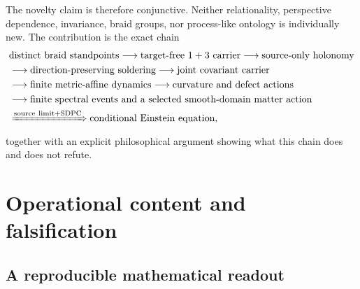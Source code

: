 \documentclass[11pt]{article}
\theoremstyle{definition}
\theoremstyle{remark}
\begin{document}
The novelty claim is therefore conjunctive. Neither relationality, perspective dependence, invariance, braid groups, nor process-like ontology is individually new. The contribution is the exact chain
\begin{equation}\label{eq:novelchain}
\begin{aligned}
&\text{distinct braid standpoints}
\longrightarrow\text{target-free $1+3$ carrier}
\longrightarrow\text{source-only holonomy}\\
&\longrightarrow\text{direction-preserving soldering}
\longrightarrow\text{joint covariant carrier}\\
&\longrightarrow\text{finite metric-affine dynamics}
\longrightarrow\text{curvature and defect actions}\\
&\longrightarrow\text{finite spectral events and a selected smooth-domain matter action}\\
&\xRightarrow{\mathrm{source\ limit+SDPC}}
 \text{conditional Einstein equation},
\end{aligned}
\end{equation}
together with an explicit philosophical argument showing what this chain does and does not refute.

\section{Operational content and falsification}

\subsection{A reproducible mathematical readout}
\end{document}
